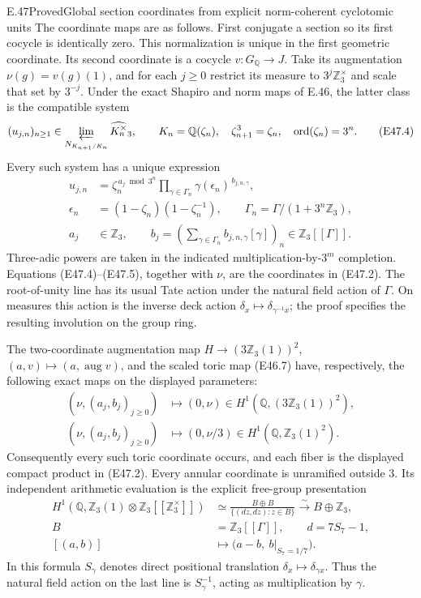 \begin{statement}{E.47}{Proved}{Global section coordinates from explicit norm-coherent cyclotomic units}
The coordinate maps are as follows. First conjugate a
section so its first cocycle is identically zero. This
normalization is unique in the first geometric coordinate.
Its second coordinate is a cocycle $v:G_{\mathbb Q}\to J$.
Take its augmentation $\nu(g)=v(g)(1)$, and for each $j\ge0$
restrict its measure to $3^j\mathbb Z_3^\times$ and scale
that set by $3^{-j}$. Under the exact Shapiro and norm
maps of E.46, the latter class is the compatible system
\[
 (u_{j,n})_{n\ge1}\in
       \varprojlim_{N_{K_{n+1}/K_n}}\widehat{K_n^\times}_3,
 \qquad K_n=\mathbb Q(\zeta_n),\quad
 \zeta_{n+1}^3=\zeta_n,\quad \operatorname{ord}(\zeta_n)=3^n.
 \tag{E47.4}
\]
Every such system has a unique expression
\[
 \begin{split}
 u_{j,n}&=\zeta_n^{\,a_j\bmod 3^n}
        \prod_{\gamma\in\Gamma_n}
                \gamma(\epsilon_n)^{\,b_{j,n,\gamma}},\\
 \epsilon_n&=(1-\zeta_n)(1-\zeta_n^{-1}),\qquad
 \Gamma_n=\Gamma/(1+3^n\mathbb Z_3),\\
 a_j&\in\mathbb Z_3,\qquad
 b_j=(\sum_{\gamma\in\Gamma_n}
             b_{j,n,\gamma}[\gamma])_n
                   \in\mathbb Z_3[[\Gamma]].
 \end{split}
 \tag{E47.5}
\]
Three-adic powers are taken in the indicated
multiplication-by-$3^m$ completion. Equations
(E47.4)--(E47.5), together with $\nu$, are the coordinates
in (E47.2). The root-of-unity line has its usual Tate
action under the natural field action of $\Gamma$.
On measures this action is the inverse deck action
$\delta_x\mapsto\delta_{\gamma^{-1}x}$; the proof
specifies the resulting involution on the group ring.

The two-coordinate augmentation map
$H\to(3\mathbb Z_3(1))^2$,
$(a,v)\mapsto(a,\operatorname{aug}v)$, and the
scaled toric map (E46.7) have, respectively, the
following exact maps on the displayed parameters:
\[
 \begin{aligned}
 (\nu,(a_j,b_j)_{j\ge0})
       &\longmapsto (0,\nu)
          \in H^1(\mathbb Q,(3\mathbb Z_3(1))^2),\\
 (\nu,(a_j,b_j)_{j\ge0})
       &\longmapsto (0,\nu/3)
          \in H^1(\mathbb Q,\mathbb Z_3(1)^2).
 \end{aligned}
 \tag{E47.6}
\]
Consequently every such toric coordinate occurs, and
each fiber is the displayed compact product in (E47.2).
Every annular coordinate is unramified outside $3$.
Its independent arithmetic evaluation is the explicit
free-group presentation
\[
 \begin{split}
 H^1(\mathbb Q,
       \mathbb Z_3(1)\otimes\mathbb Z_3[[\mathbb Z_3^\times]])
 &\simeq
 \frac{B\oplus B}{\{(d z,d z):z\in B\}}
       \xrightarrow{\sim} B\oplus\mathbb Z_3,\\
 B&=\mathbb Z_3[[\Gamma]],\qquad d=7S_7-1,\\
 [(a,b)]&\longmapsto
       \bigl(a-b,\ b\big|_{S_7=1/7}\bigr).
 \end{split}
 \tag{E47.7}
\]
In this formula $S_\gamma$ denotes direct positional
translation $\delta_x\mapsto\delta_{\gamma x}$.
Thus the natural field action on the last line is
$S_\gamma^{-1}$, acting as multiplication by $\gamma$.


\end{statement}
